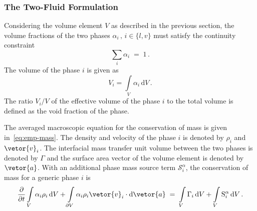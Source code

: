 \subsubsection{The Two-Fluid Formulation}\label{sec:two-fluid}
Considering the volume element $V$ as described in the previous section, 
 the volume fractions of the two phases $\alpha_{i}\,,\,i \in \{l,v\}$ must satisfy the continuity constraint 
 \begin{equation}\label{eq:vol-frac-cont}
  \sum_{i}\alpha_{i}\;=\;1\,.
 \end{equation}
 The volume of the phase $i$ is given as 
 \begin{equation}
  V_{i} = \int\limits_{V} \alpha_{i}\,\mathrm{d}V\,.
 \end{equation}
 The ratio $V_{i}/V$ of the effective volume of the phase $i$ to the total volume is defined as 
 the void fraction of the phase. 
 
The averaged macroscopic equation for the conservation of mass is given in~\eqref{eq:emp-mass}.
 The density and velocity of the phase $i$ is denoted by $\rho_{i}$ and $\vetor{v}_{i}$.
 The interfacial mass transfer unit volume between the two phases is denoted
 by $\Gamma$ and the surface area vector of the 
 volume element is denoted by $\vetor{a}$. With an additional phase mass source term $\mathcal{S}_{i}^{\alpha}$,
 the conservation of mass for a generic phase $i$ is 
 \begin{equation}\label{eq:emp-mass}
\frac{\partial}{\partial t}
\int\limits_{V} \alpha_{i} \rho_{i} \,\mathrm{d}V
+ \int\limits_{\partial V} \alpha_{i} \rho_{i} \vetor{v}_{i} \cdot \mathrm{d}\vetor{a}\;=\;
\int\limits_{V} \Gamma_{i} \,\mathrm{d}V
+ \int\limits_{V} \mathrm{S}^{\alpha}_{i} \,\mathrm{d}V\,.
\end{equation}


